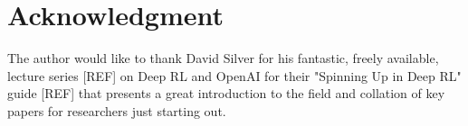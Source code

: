 \documentclass[10pt,journal,compsoc]{IEEEtran}
\begin{document}
  \section*{Acknowledgment}
\fi


The author would like to thank David Silver for his fantastic, freely available, lecture series [REF] on Deep RL and OpenAI for their "Spinning Up in Deep RL" guide [REF] that presents a great introduction to the field and collation of key papers for researchers just starting out. 


\ifCLASSOPTIONcaptionsoff
  \newpage
\fi





%
%
%

 
\end{document}
